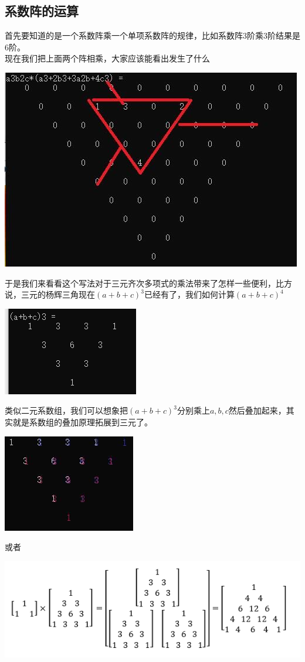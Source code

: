 \documentclass[UTF8]{ctexart}
\begin{document}
\subsection{系数阵的运算}
首先要知道的是一个系数阵乘一个单项系数阵的规律，比如系数阵$ 3 $阶乘$ 3 $阶结果是$ 6 $阶。\\
现在我们把上面两个阵相乘，大家应该能看出发生了什么
\begin{center}
	\includegraphics[width=0.7\linewidth]{0040}
\end{center}
于是我们来看看这个写法对于三元齐次多项式的乘法带来了怎样一些便利，比方说，三元的杨辉三角现在$ (a+b+c)^{3} $已经有了，我们如何计算$ (a+b+c)^{4} $
\begin{center}
	\includegraphics[width=0.4\linewidth]{0050}
\end{center}
类似二元系数组，我们可以想象把$ (a+b+c)^{3} $分别乘上$ a,b,c $然后叠加起来，其实就是系数组的叠加原理拓展到三元了。
\begin{center}
	\includegraphics[width=0.3\linewidth]{0060}
\end{center}
或者
\begin{center}
	\includegraphics[width=0.6\linewidth]{0070}
\end{center}
\end{document}
